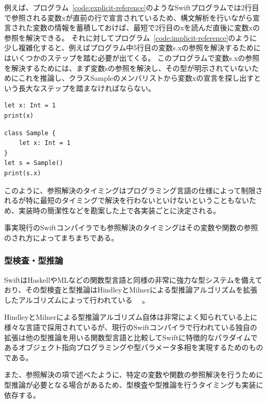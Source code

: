 例えば、プログラム~\ref{code:explicit-reference}のようなSwiftプログラムでは2行目で参照される変数xが直前の行で宣言されているため、構文解析を行いながら宣言された変数の情報を蓄積しておけば、最短で2行目のxを読んだ直後に変数xの参照を解決できる。
それに対してプログラム~\ref{code:implicit-reference}のように少し複雑化すると、例えばプログラム中5行目の変数s.xの参照を解決するためにはいくつかのステップを踏む必要が出てくる。
このプログラムで変数s.xの参照を解決するためには、まず変数sの参照を解決し、その型が明示されていないためにこれを推論し、クラスSampleのメンバリストから変数xの宣言を探し出すという長大なステップを踏まなければならない。

\begin{lstlisting}[caption=直ちに変数解決が可能である例, label=code:explicit-reference]
let x: Int = 1
print(x)
\end{lstlisting}

\begin{lstlisting}[caption=変数解決までに複数の処理が必要となる例, label=code:implicit-reference]
class Sample {
    let x: Int = 1
}
let s = Sample()
print(s.x)
\end{lstlisting}

このように、参照解決のタイミングはプログラミング言語の仕様によって制限されるが特に最短のタイミングで解決を行わないといけないということもないため、実装時の簡潔性などを勘案した上で各実装ごとに決定される。

事実現行のSwiftコンパイラでも参照解決のタイミングはその変数や関数の参照のされ方によってまちまちである。

\subsubsection{型検査・型推論}

SwiftはHaskellやMLなどの関数型言語と同様の非常に強力な型システムを備えており、その型検査と型推論はHindleyとMilnerによる型推論アルゴリズムを拡張したアルゴリズムによって行われている~\cite{swift-type-checker} ~\cite{tapl}。

HindleyとMilnerによる型推論アルゴリズム自体は非常によく知られている上に様々な言語で採用されているが、現行のSwiftコンパイラで行われている独自の拡張は他の型推論を用いる関数型言語と比較してSwiftに特徴的なパラダイムであるオブジェクト指向プログラミングや型パラメータ多相を実現するためのものである。

また、参照解決の項で述べたように、特定の変数や関数の参照解決を行うために型推論が必要となる場合があるため、型検査や型推論を行うタイミングも実装に依存する。


